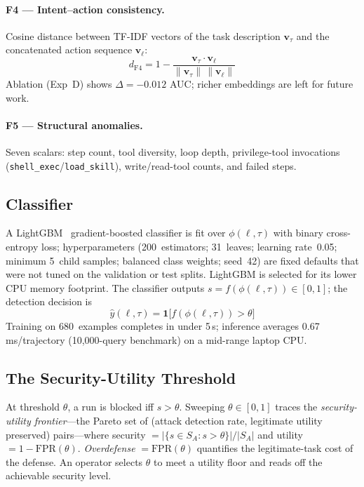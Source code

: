 \documentclass[conference]{IEEEtran}
\begin{document}
\paragraph{F4 --- Intent--action consistency.}
Cosine distance between TF-IDF vectors of the task description
$\mathbf{v}_\tau$ and the concatenated action sequence $\mathbf{v}_\ell$:
\[d_{\mathrm{F4}} = 1 - \frac{\mathbf{v}_\tau\cdot\mathbf{v}_\ell}{\|\mathbf{v}_\tau\|\,\|\mathbf{v}_\ell\|}\]
Ablation (Exp~D) shows $\Delta{=}{-}0.012$ AUC; richer embeddings
are left for future work.

\paragraph{F5 --- Structural anomalies.}
Seven scalars: step count, tool diversity, loop depth,
privilege-tool invocations (\texttt{shell\_exec}/\texttt{load\_skill}),
write/read-tool counts, and failed steps.

\subsection{Classifier}

A LightGBM~\cite{ke2017lightgbm} gradient-boosted classifier is fit
over $\phi(\ell,\tau)$ with binary cross-entropy loss; hyperparameters
(200~estimators; 31~leaves; learning rate~0.05; minimum 5~child
samples; balanced class weights; seed~42) are fixed defaults that
were not tuned on the validation or test splits.
LightGBM is selected for its lower CPU memory footprint.  The
classifier outputs $s{=}f(\phi(\ell,\tau))\in[0,1]$; the detection
decision is
\[\hat{y}(\ell,\tau)=\mathbf{1}\bigl[f(\phi(\ell,\tau))>\theta\bigr]\]
Training on 680~examples completes in under 5\,s; inference averages
0.67\,ms/trajectory (10{,}000-query benchmark) on a mid-range laptop CPU.

\subsection{The Security-Utility Threshold}
\label{sec:threshold}

At threshold $\theta$, a run is blocked iff $s > \theta$.  Sweeping
$\theta \in [0,1]$ traces the \emph{security-utility frontier}---the
Pareto set of (attack detection rate, legitimate utility preserved)
pairs---where security $= |\{s \!\in\! S_A : s > \theta\}|/|S_A|$
and utility $= 1 - \mathrm{FPR}(\theta)$.  \emph{Overdefense}
$= \mathrm{FPR}(\theta)$ quantifies the legitimate-task cost of the
defense.  An operator selects $\theta$ to meet a utility floor and
reads off the achievable security level.
\end{document}
